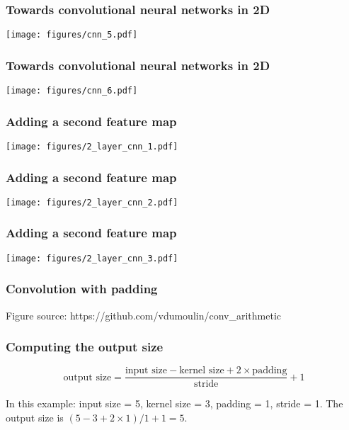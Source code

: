 \documentclass[notes]{beamer}          %
\begin{document}
\begin{frame}
\frametitle{Towards convolutional neural networks in 2D}
\begin{center}
\texttt{[image: figures/cnn\_5.pdf]} \\
\end{center}
\end{frame}

\begin{frame}
\frametitle{Towards convolutional neural networks in 2D}
\begin{center}
\texttt{[image: figures/cnn\_6.pdf]} \\
\end{center}
\end{frame}

\begin{frame}
\frametitle{Adding a second feature map}
\begin{center}
\texttt{[image: figures/2\_layer\_cnn\_1.pdf]} \\
\end{center}
\end{frame}

\begin{frame}
\frametitle{Adding a second feature map}
\begin{center}
\texttt{[image: figures/2\_layer\_cnn\_2.pdf]} \\
\end{center}
\end{frame}

\begin{frame}
\frametitle{Adding a second feature map}
\begin{center}
\texttt{[image: figures/2\_layer\_cnn\_3.pdf]} \\
\end{center}
\end{frame}

\begin{frame}
\frametitle{Convolution with padding}
\begin{center}
\end{center}
\vfill
\tiny{Figure source: https://github.com/vdumoulin/conv\_arithmetic}
\end{frame}

\begin{frame}
\frametitle{Computing the output size}
\begin{center}
\end{center}

\small{$$\text{output size} = \frac{\text{input size} - \text{kernel size} + 2 \times \text{padding}}{\text{stride}} + 1$$}

In this example: input size = 5, kernel size = 3, padding = 1, stride = 1. The output size is $(5 - 3 + 2\times1)/1 + 1 = 5$.
\end{frame}
\end{document}
